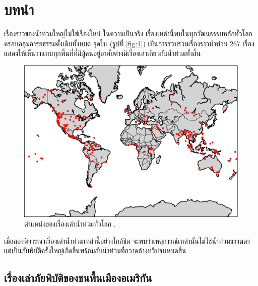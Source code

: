 \documentclass[10pt,twocolumn,letterpaper]{article}
\begin{document}
\section{บทนำ}

เรื่องราวของน้ำท่วมใหญ่ไม่ใช่เรื่องใหม่ ในความเป็นจริง เรื่องเหล่านี้พบในทุกวัฒนธรรมหลักทั่วโลก ครอบคลุมอารยธรรมดั้งเดิมทั้งหมด จุดใน (รูปที่ \ref{fig:1}) เป็นการรวบรวมเรื่องราวน้ำท่วม 267 เรื่อง \cite{3} แสดงให้เห็นว่าแทบทุกพื้นที่ที่มีผู้คนอยู่อาศัยต่างมีเรื่องเล่าเกี่ยวกับน้ำท่วมทั้งสิ้น

\begin{figure}[b]
\begin{center}
   \includegraphics[width=1\linewidth]{b.png}
\end{center}
   \caption{ตำแหน่งของเรื่องเล่าน้ำท่วมทั่วโลก \cite{3}.}
\label{fig:1}
\label{fig:onecol}
\end{figure}

เมื่อลองพิจารณาเรื่องเล่าน้ำท่วมเหล่านี้อย่างใกล้ชิด จะพบว่าเหตุการณ์เหล่านั้นไม่ใช่น้ำท่วมธรรมดา แต่เป็นภัยพิบัติครั้งใหญ่เกิดขึ้นพร้อมกับน้ำท่วมที่กวาดล้างทวีปจนหมดสิ้น

\subsection{เรื่องเล่าภัยพิบัติของชนพื้นเมืองอเมริกัน}
\end{document}
